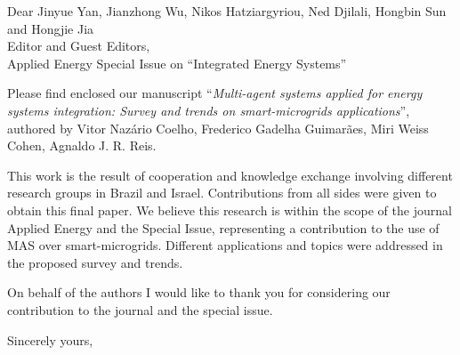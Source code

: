 \documentclass{letter}
\begin{document}
\begin{letter}{}

\opening{Dear Jinyue Yan, Jianzhong Wu, Nikos Hatziargyriou, Ned Djilali, Hongbin Sun and Hongjie Jia\\
Editor and Guest Editors, \\ Applied Energy Special Issue on ``Integrated Energy Systems''}

Please find enclosed our manuscript  ``\textit{Multi-agent systems applied for energy systems integration: Survey and trends on smart-microgrids applications}'', 
authored by Vitor Naz\'ario Coelho,  Frederico Gadelha Guimar\~aes,
Miri Weiss Cohen, Agnaldo J. R. Reis. 

This work is the result of cooperation and knowledge exchange involving different research groups in Brazil and Israel. 
Contributions from all sides were given to obtain this final paper.  
We believe this research is within the scope of the journal Applied Energy and the Special Issue, 
representing a contribution to the use of MAS over smart-microgrids.
Different applications and topics were addressed in the proposed survey and trends.


On behalf of the authors I would like to thank you for considering our contribution to the journal and the special issue.

\closing{Sincerely yours,}
\end{letter}
\end{document}
